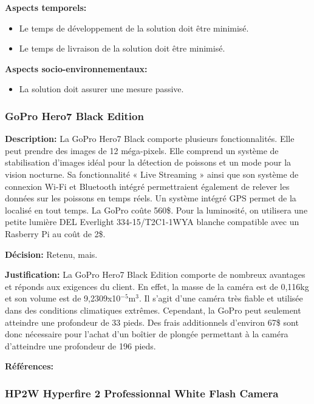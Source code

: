 \textbf{Aspects temporels:}
\begin{itemize}[label = {--}]
    \item Le temps de développement de la solution doit être minimisé.
    \item Le temps de livraison de la solution doit être minimisé.
\end{itemize}

\textbf{Aspects socio-environnementaux:}
\begin{itemize}[label = {--}]
    \item La solution doit assurer une mesure passive.
\end{itemize}

\subsubsection{GoPro Hero7 Black Edition}

\textbf{Description:} La GoPro Hero7 Black comporte plusieurs fonctionnalités. Elle peut prendre des images de 12 méga-pixels. Elle comprend un système de stabilisation d'images idéal pour la détection de poissons et un mode pour la vision nocturne. Sa fonctionnalité « Live Streaming » ainsi que son système de connexion Wi-Fi et Bluetooth intégré permettraient également de relever les données sur les poissons en temps réels. Un système intégré GPS permet de la localisé en tout temps. La GoPro coûte 560\$. Pour la luminosité, on utilisera une petite lumière DEL Everlight 334-15/T2C1-1WYA blanche compatible avec un Rasberry Pi au coût de 2\$.

\textbf{Décision:} Retenu, mais.

\textbf{Justification:} La GoPro Hero7 Black Edition comporte de nombreux avantages et réponds aux exigences du client. En effet, la masse de la caméra est de 0,116kg et son volume est de 9,2309x10$^{-5}$m$^3$. Il s'agit d'une caméra très fiable et utilisée dans des conditions climatiques extrêmes. Cependant, la GoPro peut seulement atteindre une profondeur de 33 pieds. Des frais additionnels d'environ 67\$ sont donc nécessaire pour l'achat d'un boîtier de plongée permettant à la caméra d'atteindre une profondeur de 196 pieds.

\textbf{Références:} \cite{GoPro_Specs} \cite{GoPro_Waterproof} \cite{DEL}


\subsubsection{HP2W Hyperfire 2 Professionnal White Flash Camera}
\label{subsubsectionHyperfire}

